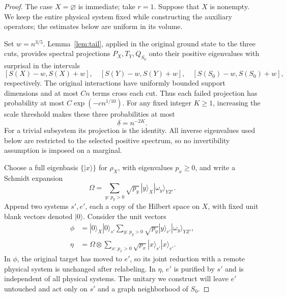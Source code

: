 \begin{proof}
The case $X=\varnothing$ is immediate; take $r=1$.  Suppose that
$X$ is nonempty.  We keep the entire physical system fixed while
constructing the auxiliary operators; the estimates below are uniform
in its volume.

Set $w=n^{3/5}$.  Lemma~\ref{lem:tail}, applied in the original
ground state to the three cuts, provides spectral projections
$P_X,T_Y,Q_{S_0}$ onto their positive eigenvalues with surprisal in
the intervals
\[
 [S(X)-w,S(X)+w],\quad [S(Y)-w,S(Y)+w],\quad
 [S(S_0)-w,S(S_0)+w],
\]
respectively.  The original interactions have uniformly bounded
support dimensions and at most $Cn$ terms cross each cut.
Thus each failed projection has probability at most
$C\exp(-cn^{1/10})$.  For any fixed integer $K\ge1$, increasing
the scale threshold makes these three probabilities at most
\begin{equation}\label{eq:amplification-typical-error}
 \delta=n^{-2K}.
\end{equation}
For a trivial subsystem its projection is the identity.  All inverse
eigenvalues used below are restricted to the selected positive
spectrum, so no invertibility assumption is imposed on a marginal.

Choose a full eigenbasis $\{|x\rangle\}$ for $\rho_X$, with
eigenvalues $p_x\ge0$, and write a Schmidt expansion
\[
 \Omega=\sum_{y:\,p_y>0}\sqrt{p_y}\,
 |y\rangle_X|\omega_y\rangle_{YZ'}.
\]
Append two systems $s',e'$, each a copy of the Hilbert space on $X$,
with fixed unit blank vectors denoted $|0\rangle$.
Consider the unit vectors
\begin{align}
 \phi&=|0\rangle_X|0\rangle_{s'}
       \sum_{y:\,p_y>0}\sqrt{p_y}|y\rangle_{e'}
                                    |\omega_y\rangle_{YZ'},
       \label{eq:amplification-swapped-state}\\
 \eta&=\Omega\otimes
       \sum_{x:\,p_x>0}\sqrt{p_x}|x\rangle_{s'}|x\rangle_{e'}.
       \label{eq:amplification-restored-state}
\end{align}
In $\phi$, the original target has moved to $e'$, so its joint
reduction with a remote physical system is unchanged after relabeling.
In $\eta$, $e'$ is purified by $s'$ and is independent of all physical
systems.  The unitary we construct will leave $e'$ untouched and act
only on $s'$ and a graph neighborhood of $S_0$.


\end{proof}
